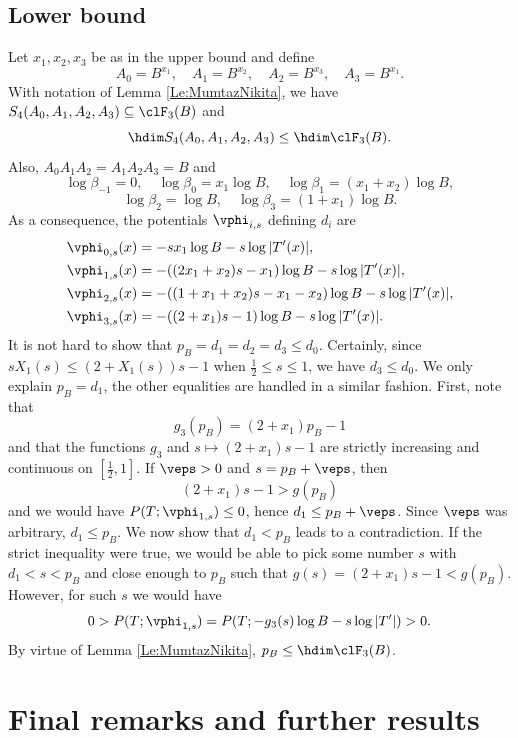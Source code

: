\documentclass[12pt,a4paper]{amsart}
\begin{document}
\subsection{Lower bound}

Let $x_1,x_2,x_3$ be as in the upper bound and define
\[
A_0 = B^{x_1}, \quad
A_1 = B^{x_2}, \quad
A_2 = B^{x_3}, \quad
A_3 = B^{x_1}.
\]
With notation of Lemma \ref{Le:MumtazNikita}, we have $S_4(A_0,A_1,A_2,A_3)\subseteq \clF_3(B)$ and
\[
\hdim S_4(A_0,A_1,A_2,A_3)\leq  \hdim \clF_3(B).
\]
Also, $A_0A_1A_2=A_1A_2A_3=B$ and
\[
\log \beta_{-1} =0, \quad
\log \beta_{0} = x_1\log B, \quad
\log \beta_{1} = (x_1+x_2)\log B, 
\]
\[
\log \beta_{2} = \log B, \quad
\log \beta_{3} = (1+x_1)\log B.
\]
As a consequence, the potentials $\vphi_{i,s}$ defining $d_i$ are
\begin{align*}
\vphi_{0,s}(x) 
&= 
-sx_1\log B -s \log|T'(x)|, \\
\vphi_{1,s}(x) 
&= 
-((2x_1+x_2)s - x_1) \log B - s\log|T'(x)|, \\
\vphi_{2,s}(x) 
&= 
-((1+x_1+x_2)s-x_1-x_2) \log B - s\log|T'(x)|, \\
\vphi_{3,s}(x) 
&= -((2+x_1)s-1)\log B  - s\log|T'(x)|.
\end{align*}
It is not hard to show that $p_B=d_1=d_2=d_3\leq d_0$. Certainly, since $sX_1(s)\leq (2+X_1(s))s-1$ when $\frac{1}{2}\leq s\leq 1$, we have $d_3\leq d_0$. We only explain $p_B=d_1$, the other equalities are handled in a similar fashion. First, note that 
\[
g_3(p_B)
= 
(2+x_1)p_B-1
\]
and that the functions $g_3$ and $s\mapsto (2+x_1)s-1$ are strictly increasing and continuous on $\left[\frac{1}{2}, 1\right]$. If $\veps>0$ and $s=p_B+\veps$, then 
\[
(2+x_1)s-1
>
g(p_B)
\]
and we would have $P(T;\vphi_{1,s})\leq 0$, hence $d_1\leq p_B+\veps$. Since $\veps$ was arbitrary, $d_1\leq p_B$. We now show that $d_1< p_B$ leads to a contradiction. If the strict inequality were true, we would be able to pick some number $s$ with $d_1<s<p_B$ and close enough to $p_B$ such that $g(s)=(2+x_1)s-1<g(p_B)$. However, for such $s$ we would have 
\[
0>
P(T;\vphi_{1,s})
= 
P(T;-g_3(s)\log B - s\log|T'|)>0.
\]
By virtue of Lemma  \ref{Le:MumtazNikita}, $p_B\leq \hdim \clF_3(B)$.

\section{Final remarks and further results}\label{Section:FinalRemarks}
\end{document}
